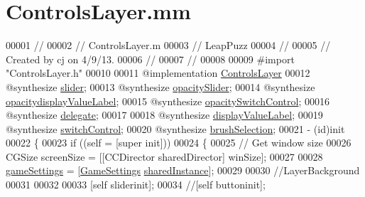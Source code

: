 \hypertarget{_controls_layer_8mm}{\section{Controls\-Layer.\-mm}
\label{db/d91/_controls_layer_8mm}
}

\begin{DoxyCode}
00001 \textcolor{comment}{//}
00002 \textcolor{comment}{//  ControlsLayer.m}
00003 \textcolor{comment}{//  LeapPuzz}
00004 \textcolor{comment}{//}
00005 \textcolor{comment}{//  Created by cj on 4/9/13.}
00006 \textcolor{comment}{//}
00007 \textcolor{comment}{//}
00008 
00009 \textcolor{preprocessor}{#import "ControlsLayer.h"}
00010 
00011 \textcolor{keyword}{@implementation }\hyperlink{interface_controls_layer}{ControlsLayer}
00012 \textcolor{keyword}{@synthesize} \hyperlink{interface_controls_layer_a599701380c37caf4e656efaa860469a3}{slider};
00013 \textcolor{keyword}{@synthesize} \hyperlink{interface_controls_layer_aff48213936f8ff3b2aa2f44d5125fc6f}{opacitySlider};
00014 \textcolor{keyword}{@synthesize} \hyperlink{interface_controls_layer_a1a60fd6edd83a2789b575845390a44be}{opacitydisplayValueLabel};
00015 \textcolor{keyword}{@synthesize} \hyperlink{interface_controls_layer_ad2bbac273b79a99c46e66c61ea66c88b}{opacitySwitchControl};
00016 \textcolor{keyword}{@synthesize} \hyperlink{interface_controls_layer_aebfe5471226d1bc0afef5d662219f913}{delegate};
00017 
00018 \textcolor{keyword}{@synthesize} \hyperlink{interface_controls_layer_ab9f12f7a90a0bf6ae1abaeb4d4c4e378}{displayValueLabel};
00019 \textcolor{keyword}{@synthesize} \hyperlink{interface_controls_layer_a8997cfae8a4f6bcfb8c53d8cab6bb480}{switchControl};
00020 \textcolor{keyword}{@synthesize} \hyperlink{interface_controls_layer_a56c514c5fde8025a9de19c4b8225478b}{brushSelection};
00021 - (id)init
00022 \{
00023     \textcolor{keywordflow}{if} ((\textcolor{keyword}{self} = [super init]))
00024     \{
00025         \textcolor{comment}{// Get window size}
00026         CGSize screenSize = [[CCDirector sharedDirector] winSize];
00027         
00028         \hyperlink{interface_controls_layer_a6fb04c60ed1bfab11e2940a025b4927e}{gameSettings} = [\hyperlink{interface_game_settings}{GameSettings} \hyperlink{interface_game_settings_abdcc2e77ea14381a85c6de67c83df624}{sharedInstance}];
00029         
00030         \textcolor{comment}{//LayerBackground}
00031         
00032         
00033         [\textcolor{keyword}{self} sliderinit];
00034         \textcolor{comment}{//[self buttoninit];}

\end{DoxyCode}
